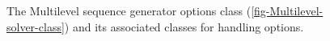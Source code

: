 \begin{figure}[htpb]
 \vspace{-.2cm}
\caption{The Multilevel sequence generator options class (\ref{fig-Multilevel-solver-class}) and its associated classes for handling options.}
\label{fig-Multilevel-options-class}
\end{figure}


